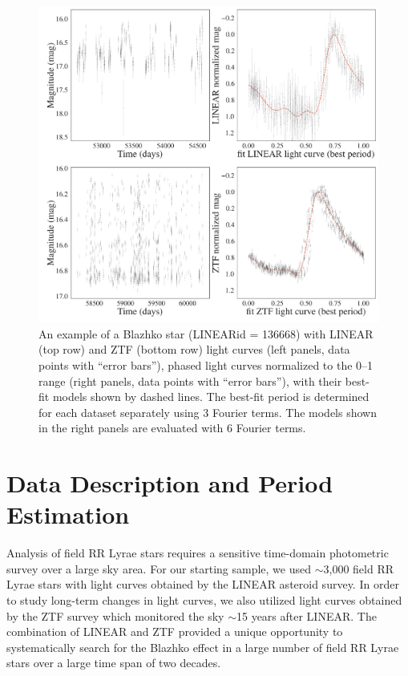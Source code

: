 
\phantom{There is some latex bug somewhere and this dummy call is needed to force it to make pdf...}



\begin{figure}[ht]
  \centering
  \includegraphics[width=18cm]{lc_pair.png}
  \vskip -0.2in
  \caption{An example of a Blazhko star (LINEARid = 136668) with LINEAR (top row) and ZTF (bottom row) light
    curves (left panels, data points with ``error bars''), phased light curves normalized to the 0--1 range (right panels, data points
    with ``error bars''), with their best-fit models shown by dashed lines. The best-fit period is determined for each
    dataset separately using 3 Fourier terms. The models shown in the right panels are evaluated with 6 Fourier terms. }
 \label{fig:lc_pair}
\end{figure}


\section{Data Description and Period Estimation \label{sec:data}}

Analysis of field RR Lyrae stars requires a sensitive time-domain photometric survey over a large sky area.
For our starting sample, we used $\sim$3,000 field RR Lyrae stars with light curves obtained by the LINEAR
asteroid survey. In order to study long-term changes in light curves, we also utilized light curves obtained
by the ZTF survey which monitored the sky $\sim$15 years after LINEAR. The combination of LINEAR and
ZTF provided a unique opportunity to systematically search for the Blazhko effect in a large number of
field RR Lyrae stars over a large time span of two decades. 

